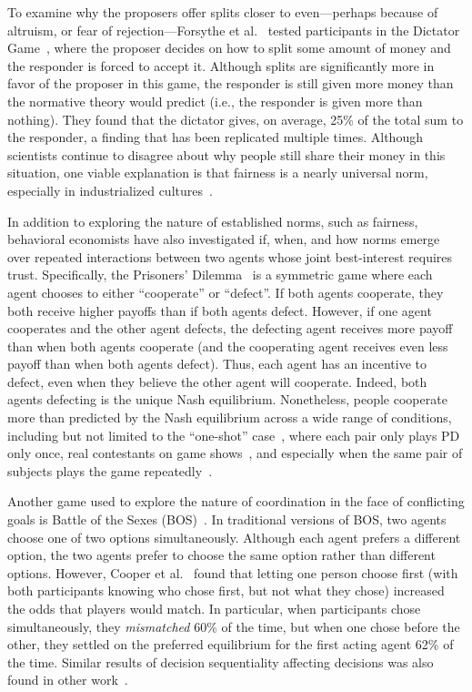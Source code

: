 To examine why the proposers offer splits closer to even---perhaps
because of altruism, or fear of rejection---Forsythe et
al.~\cite{forsythe94} tested participants in the Dictator
Game~\cite{kahneman86}, where the proposer decides on how to split
some amount of money and the responder is forced to accept
it. Although splits are significantly more in favor of the proposer in
this game, the responder is still given more money than the normative
theory would predict (i.e., the responder is given more than
nothing). They found that the dictator gives, on average, 25\% of the
total sum to the responder, a finding that has been replicated
multiple times. Although scientists continue to disagree about why
people still share their money in this situation,
one viable explanation is that fairness is a nearly universal norm,
especially in industrialized cultures~\cite{henrich05}.

In addition to exploring the nature of established norms, such as
fairness, behavioral economists have also investigated if, when, and
how norms emerge over repeated interactions between two agents whose
joint best-interest requires trust. Specifically, the Prisoners'
Dilemma~\cite{luce57} is a symmetric game where each agent chooses to
either ``cooperate'' or ``defect''. If both agents cooperate, they
both receive higher payoffs than if both agents defect. However, if
one agent cooperates and the other agent defects, the defecting agent
receives more payoff than when both agents cooperate (and the
cooperating agent receives even less payoff than when both agents
defect). Thus, each agent has an incentive to defect, even when they
believe the other agent will cooperate. Indeed, both agents defecting
is the unique Nash equilibrium. Nonetheless, people cooperate more
than predicted by the Nash equilibrium across a wide range of
conditions, including but not limited to the ``one-shot''
case~\cite{rapoport88}, where each pair only plays PD only once, real
contestants on game shows~\cite{list06}, and especially when the same
pair of subjects plays the game repeatedly~\cite{rand13,sally95}.

Another game used to explore the nature of coordination in the face of
conflicting goals is Battle of the Sexes (BOS)~\cite{luce57}. In
traditional versions of BOS, two agents choose one of two options
simultaneously. Although each agent prefers a different option, the
two agents prefer to choose the same option rather than different options.
However, Cooper et al.~\cite{cooper94} found that letting
one person choose first (with both participants knowing who
chose first, but not what they chose) increased the odds
that players would match. In particular, when participants
chose simultaneously, they {\em mismatched} 60\% of the time,
but when one chose before the other, they settled on the 
preferred equilibrium for the first acting agent 62\% of the time.
Similar results of decision sequentiality affecting decisions
was also found in other work~\cite{rapoport97,ho96}.

